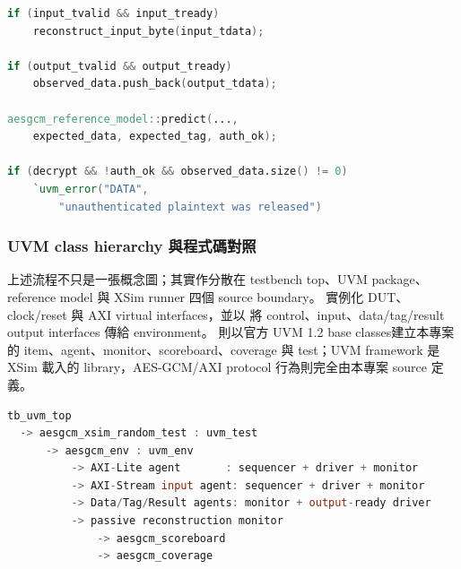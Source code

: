 \documentclass[UTF8,fontset=none,11pt,a4paper]{ctexrep}
\newcommand{\code}[1]{\texttt{\detokenize{#1}}}
\begin{document}
\begin{lstlisting}[language=Verilog]
if (input_tvalid && input_tready)
    reconstruct_input_byte(input_tdata);

if (output_tvalid && output_tready)
    observed_data.push_back(output_tdata);

aesgcm_reference_model::predict(...,
    expected_data, expected_tag, auth_ok);

if (decrypt && !auth_ok && observed_data.size() != 0)
    `uvm_error("DATA",
        "unauthenticated plaintext was released")
\end{lstlisting}

\subsubsection{UVM class hierarchy 與程式碼對照}

上述流程不只是一張概念圖；其實作分散在 testbench top、UVM package、reference model 與 XSim runner 四個 source boundary。 實例化 DUT、clock/reset 與 AXI virtual interfaces，並以 \code{uvm\_config\_db} 將 control、input、data/tag/result output interfaces 傳給 environment。 則以官方 UVM 1.2 base classes建立本專案的 item、agent、monitor、scoreboard、coverage 與 test；UVM framework 是 XSim 載入的 library，AES-GCM/AXI protocol 行為則完全由本專案 source 定義。

\begin{lstlisting}[language=Verilog]
tb_uvm_top
  -> aesgcm_xsim_random_test : uvm_test
      -> aesgcm_env : uvm_env
          -> AXI-Lite agent       : sequencer + driver + monitor
          -> AXI-Stream input agent: sequencer + driver + monitor
          -> Data/Tag/Result agents: monitor + output-ready driver
          -> passive reconstruction monitor
              -> aesgcm_scoreboard
              -> aesgcm_coverage
\end{lstlisting}
\end{document}
